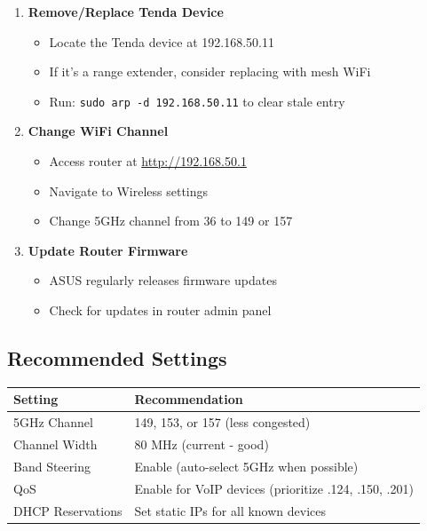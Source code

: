 \documentclass[11pt,letterpaper]{article}
\begin{document}
\begin{enumerate}
    \item \textbf{Remove/Replace Tenda Device}
    \begin{itemize}
        \item Locate the Tenda device at 192.168.50.11
        \item If it's a range extender, consider replacing with mesh WiFi
        \item Run: \texttt{sudo arp -d 192.168.50.11} to clear stale entry
    \end{itemize}

    \item \textbf{Change WiFi Channel}
    \begin{itemize}
        \item Access router at \url{http://192.168.50.1}
        \item Navigate to Wireless settings
        \item Change 5GHz channel from 36 to 149 or 157
    \end{itemize}

    \item \textbf{Update Router Firmware}
    \begin{itemize}
        \item ASUS regularly releases firmware updates
        \item Check for updates in router admin panel
    \end{itemize}
\end{enumerate}

\subsection{Recommended Settings}

\begin{center}
\begin{tabular}{lp{8cm}}
\toprule
\textbf{Setting} & \textbf{Recommendation} \\
\midrule
5GHz Channel & 149, 153, or 157 (less congested) \\
Channel Width & 80 MHz (current - good) \\
Band Steering & Enable (auto-select 5GHz when possible) \\
QoS & Enable for VoIP devices (prioritize .124, .150, .201) \\
DHCP Reservations & Set static IPs for all known devices \\
\bottomrule
\end{tabular}
\end{center}
\end{document}
